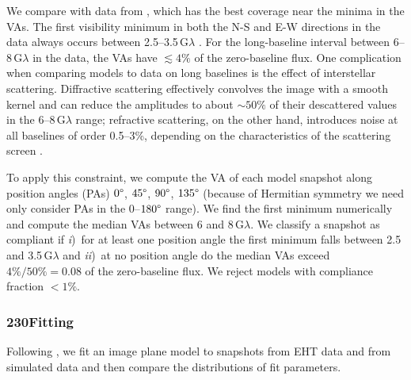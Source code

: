 We compare with data from \aprilvii, which has the best \uv
coverage near the minima in the VAs.
The first visibility minimum in both the N-S and E-W directions in the data always occurs between 2.5--3.5\,$\mathrm{G}\lambda$ .
For the long-baseline interval between 6--8\,$\mathrm{G}\lambda$ in the data,
the VAs have $\lesssim 4\%$ of the zero-baseline flux.
One complication when comparing models to data on long baselines is
the effect of interstellar scattering.
Diffractive scattering effectively convolves the image with a smooth
kernel and can reduce the amplitudes to about $\sim 50\%$ of their
descattered values in the 6--8\,$\mathrm{G}\lambda$ range; refractive
scattering, on the other hand, introduces noise at all baselines of
order 0.5--3\%, depending on the characteristics of the
scattering screen \citep{2018arXiv180501242P, 2018ApJ...865..104J}.

To apply this constraint, we compute the VA of each model snapshot
along position angles (PAs) $0\degree$, $45\degree$, $90\degree$,
$135\degree$ (because of Hermitian symmetry we need only consider PAs in the 0--$180\degree$ range).
We find the first minimum numerically and compute the median VAs
between 6 and 8\,$\mathrm{G}\lambda$.
We classify a snapshot as compliant if
\emph{i})~for at least one position angle the first minimum falls
between 2.5 and 3.5\,$\mathrm{G}\lambda$ and
\emph{ii})~at no position angle do the median VAs exceed $4\% / 50\% = 0.08$ of the zero-baseline flux.
We reject models with compliance fraction $< 1\%$.

\subsubsection{230\GHz \Mring Fitting}

Following , we fit an \mring image plane model to snapshots from EHT data and from simulated data and then compare the distributions of fit parameters.  

